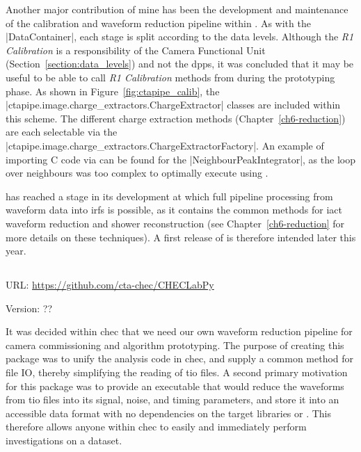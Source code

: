 Another major contribution of mine has been the development and maintenance of the calibration and waveform reduction pipeline within . As with the |DataContainer|, each stage is split according to the data levels. Although the \textit{R1 Calibration} is a responsibility of the Camera Functional Unit (Section~\ref{section:data_levels}) and not the \gls{dpps}, it was concluded that it may be useful to be able to call \textit{R1 Calibration} methods from  during the prototyping phase. As shown in Figure~\ref{fig:ctapipe_calib}, the |ctapipe.image.charge_extractors.ChargeExtractor| classes are included within this scheme. The different charge extraction methods (Chapter~\ref{ch6-reduction}) are each selectable via the |ctapipe.image.charge_extractors.ChargeExtractorFactory|. An example of importing C code via  can be found for the |NeighbourPeakIntegrator|, as the loop over neighbours was too complex to optimally execute using .

 has reached a stage in its development at which full pipeline processing from waveform data into \glspl{irf} is possible, as it contains the common methods for \gls{iact} waveform reduction and shower reconstruction (see Chapter~\ref{ch6-reduction} for more details on these techniques). A first release of  is therefore intended later this year.

\subsection{}
\vspace{-0.7em}
\noindent \hspace{\parindent} {\tiny URL: \url{https://github.com/cta-chec/CHECLabPy} \par}
\noindent \hspace{\parindent} {\tiny Version: ?? \par}

\noindent It was decided within \gls{chec} that we need our own waveform reduction pipeline for camera commissioning and algorithm prototyping. The purpose of creating this package was to unify the analysis code in \gls{chec}, and supply a common method for file IO, thereby simplifying the reading of \gls{tio} files. A second primary motivation for this package was to provide an executable that would reduce the waveforms from \gls{tio} files into its signal, noise, and timing parameters, and store it into an accessible data format with no dependencies on the \gls{target} libraries or . This therefore allows anyone within \gls{chec} to easily and immediately perform investigations on a dataset.

